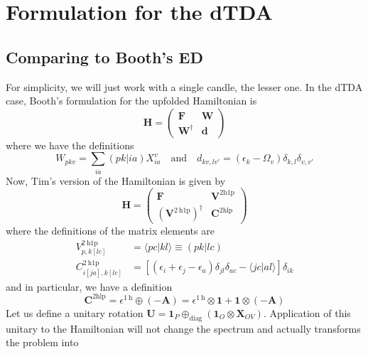 \section{Formulation for the dTDA}
\subsection{Comparing to Booth's ED}
For simplicity, we will just work with a single candle, the lesser one. In the dTDA case, Booth's formulation for the upfolded Hamiltonian is
\begin{equation}
    \bm{H} = \begin{pmatrix} \bm{F} & \bm{W} \\ \bm{W}^{\dagger} & \bm{d} \end{pmatrix}
\label{eq:booth_hamiltonian}
\end{equation}
where we have the definitions
\begin{equation}
    W_{pkv} = \sum_{ia} (pk|ia) X_{ia}^{v} \quad \text{and} \quad d_{kv,lv'} = \left(\epsilon_k - \Omega_v\right) \delta_{k,l} \delta_{v,v'}
\label{eq:booth_definitions}
\end{equation}
Now, Tim's version of the Hamiltonian is given by
\begin{equation}
    \bm{H} = \begin{pmatrix} \bm{F} & \bm{V}^{2 \mathrm{h1p}}\\ \left(\bm{V}^{2 \mathrm{~h} 1 \mathrm{p}}\right)^{\dagger} & \bm{C}^{2 \mathrm{hlp}} \end{pmatrix}
\label{eq:tim_hamiltonian}
\end{equation}
where the definitions of the matrix elements are
\begin{align}
    V_{p, k[l c]}^{2 \mathrm{~h} 1 \mathrm{p}} &= \langle p c | k l \rangle \equiv (pk|lc) \\
    C_{i[j a], k[l c]}^{2 \mathrm{~h} 1 \mathrm{p}} &= \left[\left(\epsilon_i+\epsilon_j-\epsilon_a\right) \delta_{j l} \delta_{a c}-\langle j c | a l \rangle\right] \delta_{i k}
\end{align}
and in particular, we have a definition 
\begin{equation}
    \bm{C}^{2 \mathrm{hlp}} = \epsilon^{1 \mathrm{~h}} \oplus (-\bm{A}) = \epsilon^{1 \mathrm{~h}} \otimes \bm{1} + \bm{1} \otimes (-\bm{A})
\label{eq:tim_c_hlp}
\end{equation}
Let us define a unitary rotation $\bm{U} = \bm{1}_P \oplus_{\text{diag}} \left( \bm{1}_O \otimes \bm{X}_{OV} \right)$. Application of this unitary to the Hamiltonian will not change the spectrum and actually transforms the problem into
